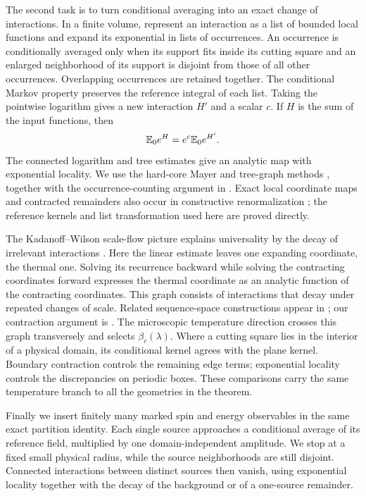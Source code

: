The second task is to turn conditional averaging into an exact change
of interactions. In a finite volume, represent an interaction as a list of bounded local
functions and expand its exponential in lists of occurrences. An
occurrence is conditionally averaged only when its support fits inside
its cutting square and an enlarged neighborhood of its support is
disjoint from those of all other occurrences. Overlapping occurrences are retained together. The
conditional Markov property preserves the reference integral of each
list. Taking the pointwise logarithm gives a new interaction $H'$ and
a scalar $c$. If $H$ is the sum of the input functions, then
\[
                 \mathbb E_0e^H=e^c\mathbb E_0e^{H'}.
\]
The connected logarithm and tree estimates give an analytic map with
exponential locality. We use the hard-core Mayer and tree-graph methods
\cite{FP2007,PY2017}, together with the occurrence-counting argument in
. Exact local coordinate maps and contracted
remainders also occur in constructive renormalization
\cite{BS2015}; the reference kernels and list transformation used here
are proved directly.

The Kadanoff--Wilson scale-flow picture explains universality by the
decay of irrelevant interactions \cite{Kadanoff1966,Wilson1971}.
Here the linear estimate leaves one expanding coordinate, the thermal
one. Solving its recurrence backward while solving the contracting
coordinates forward expresses the thermal coordinate as an analytic
function of the contracting coordinates. This graph consists of
interactions that decay under repeated changes of scale. Related
sequence-space constructions appear in \cite{BBS2015}; our contraction argument is
. The microscopic temperature direction crosses
this graph transversely and selects $\beta_c(\lambda)$. Where a cutting
square lies in the interior of a physical domain, its conditional kernel
agrees with the plane kernel. Boundary contraction controls the remaining
edge terms; exponential locality controls the discrepancies on periodic
boxes. These comparisons carry the same temperature branch to all the
geometries in the theorem.

Finally we insert finitely many marked spin and energy observables in
the same exact partition identity. Each single source approaches a
conditional average of its reference field, multiplied by one
domain-independent amplitude. We
stop at a fixed small physical radius, while the source neighborhoods
are still disjoint. Connected interactions between distinct sources
then vanish, using exponential locality together with the decay of the
background or of a one-source remainder.


